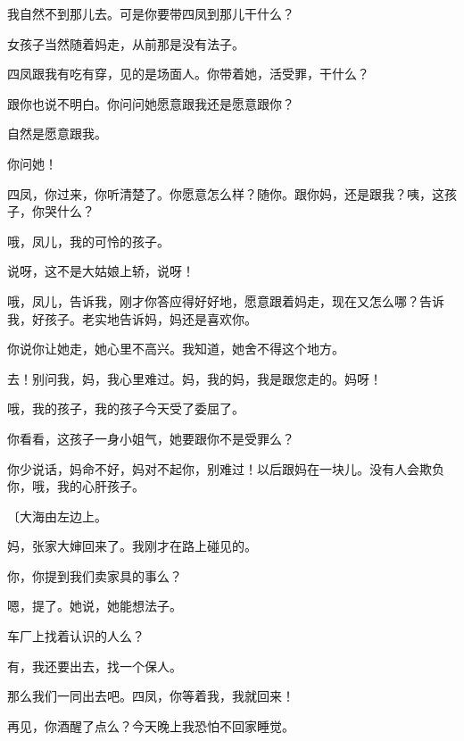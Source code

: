我自然不到那儿去。可是你要带四凤到那儿干什么？

女孩子当然随着妈走，从前那是没有法子。

四凤跟我有吃有穿，见的是场面人。你带着她，活受罪，干什么？

跟你也说不明白。你问问她愿意跟我还是愿意跟你？

自然是愿意跟我。

你问她！

四凤，你过来，你听清楚了。你愿意怎么样？随你。跟你妈，还是跟我？咦，这孩子，你哭什么？

哦，凤儿，我的可怜的孩子。

说呀，这不是大姑娘上轿，说呀！

哦，凤儿，告诉我，刚才你答应得好好地，愿意跟着妈走，现在又怎么哪？告诉我，好孩子。老实地告诉妈，妈还是喜欢你。

你说你让她走，她心里不高兴。我知道，她舍不得这个地方。

去！别问我，妈，我心里难过。妈，我的妈，我是跟您走的。妈呀！

哦，我的孩子，我的孩子今天受了委屈了。

你看看，这孩子一身小姐气，她要跟你不是受罪么？

你少说话，妈命不好，妈对不起你，别难过！以后跟妈在一块儿。没有人会欺负你，哦，我的心肝孩子。

{\fangsong〔大海由左边上。}

妈，张家大婶回来了。我刚才在路上碰见的。

你，你提到我们卖家具的事么？

嗯，提了。她说，她能想法子。

车厂上找着认识的人么？

有，我还要出去，找一个保人。

那么我们一同出去吧。四凤，你等着我，我就回来！

再见，你酒醒了点么？今天晚上我恐怕不回家睡觉。

